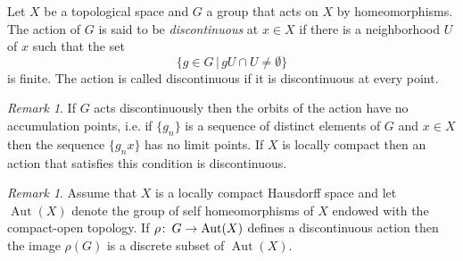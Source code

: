 \documentclass[12pt]{article}
\theoremstyle{definition}
\theoremstyle{remark}
\newtheorem{rem}[thm]{Remark}
\numberwithin{equation}{subsection}
\newcommand{\Gr}{\rho}
\newcommand{\Au}{ \operatorname{Aut}}
\def\co{\colon\thinspace}
\begin{document}
Let $X$ be a topological space and $G$ a group that acts on $X$ by
homeomorphisms. The action of $G$ is said to be
\emph{discontinuous} at $x \in X$ if there is a neighborhood $U$ of $x$ such
that the set
$$\{g\in G\, |\, gU\cap U\neq \emptyset\}$$
is finite. The action is called discontinuous if it is discontinuous at
every point.

\begin{rem}
If $G$ acts discontinuously then the orbits of the action have no
accumulation points, i.e. if $\{g_n\}$ is a sequence of distinct elements of
$G$ and
$x\in X$ then the sequence    $\{g_nx\}$ has no limit points. If $X$ is
locally compact then an action that satisfies this condition is discontinuous. 
\end{rem}

\begin{rem}
Assume that $X$ is a locally compact Hausdorff space and let  $\Au(X)$
denote the group of self homeomorphisms of $X$ endowed with the 
compact-open topology.
  If $\Gr\co G\to \Au(X)$ defines a discontinuous action 
then the image
  $\Gr(G)$ is a discrete subset of $\Au(X)$.
\end{rem}
\end{document}
